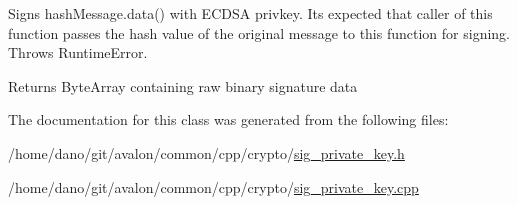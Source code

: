 Signs hash\+Message.\+data() with E\+C\+D\+SA privkey. It\textquotesingle{}s expected that caller of this function passes the hash value of the original message to this function for signing. Throws Runtime\+Error. \begin{DoxyReturn}{Returns}
Byte\+Array containing raw binary signature data 
\end{DoxyReturn}


The documentation for this class was generated from the following files\+:\begin{DoxyCompactItemize}
\item 
/home/dano/git/avalon/common/cpp/crypto/\hyperlink{sig__private__key_8h}{sig\+\_\+private\+\_\+key.\+h}\item 
/home/dano/git/avalon/common/cpp/crypto/\hyperlink{sig__private__key_8cpp}{sig\+\_\+private\+\_\+key.\+cpp}\end{DoxyCompactItemize}
